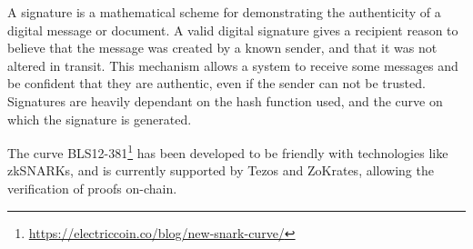 A signature is a mathematical scheme for demonstrating the authenticity of a digital message or document. A valid digital signature gives a recipient reason to believe that the message was created by a known sender, and that it was not altered in transit. This mechanism allows a system to receive some messages and be confident that they are authentic, even if the sender can not be trusted. Signatures are heavily dependant on the hash function used, and the curve on which the signature is generated.

The curve BLS12-381\footnote{\url{https://electriccoin.co/blog/new-snark-curve/}} has been developed to be friendly with technologies like zkSNARKs, and is currently supported by Tezos and ZoKrates, allowing the verification of proofs on-chain.